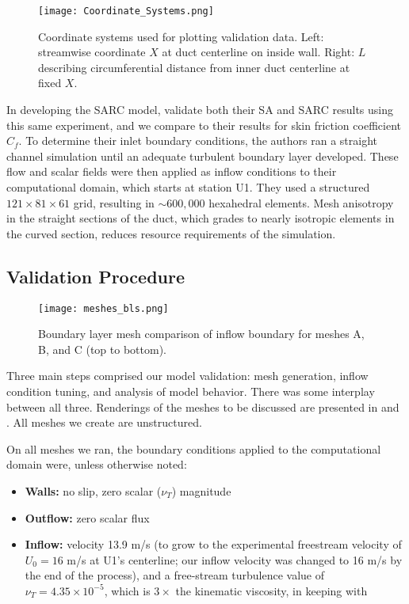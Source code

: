 \documentclass[11pt]{article}
\begin{document}
\begin{figure}[b!]
\centering
\texttt{[image: Coordinate\_Systems.png]}
\caption{Coordinate systems used for plotting validation data. Left: streamwise coordinate $X$ at duct centerline on inside wall. Right: $L$ describing circumferential distance from inner duct centerline at fixed $X$.}
\label{fig:coordinates}
\end{figure}

In developing the SARC model, \citet{shur2000} validate both their SA and SARC results using this same experiment, and we compare to their results for skin friction coefficient $C_f$. To determine their inlet boundary conditions, the authors ran a straight channel simulation until an adequate turbulent boundary layer developed. These flow and scalar fields were then applied as inflow conditions to their computational domain, which starts at station U1. They used a structured $121 \times 81 \times 61$ grid, resulting in $\sim 600,000$ hexahedral elements. Mesh anisotropy in the straight sections of the duct, which grades to nearly isotropic elements in the curved section, reduces resource requirements of the simulation.

\subsection{Validation Procedure}

\begin{wrapfigure}{r}{3.5in}
\centering
\texttt{[image: meshes\_bls.png]}
\caption{Boundary layer mesh comparison of inflow boundary for meshes A, B, and C (top to bottom).}
\label{fig:mesh_bls}
\end{wrapfigure}

Three main steps comprised our model validation: mesh generation, inflow condition tuning, and analysis of model behavior. There was some interplay between all three. Renderings of the meshes to be discussed are presented in  and . All meshes we create are unstructured.

On all meshes we ran, the boundary conditions applied to the computational domain were, unless otherwise noted:
\begin{itemize}
\item \textbf{Walls:} no slip, zero scalar ($\nu_T$) magnitude
\item \textbf{Outflow:} zero scalar flux
\item \textbf{Inflow:} velocity 13.9 m/s (to grow to the experimental freestream velocity of $U_0 = 16$ m/s at U1's centerline; our inflow velocity was changed to 16 m/s by the end of the process), and a free-stream turbulence value of $\nu_T = 4.35 \times 10^{-5}$, which is $3\times$ the kinematic viscosity, in keeping with \citet{spalart2001}
\end{itemize}
\end{document}
